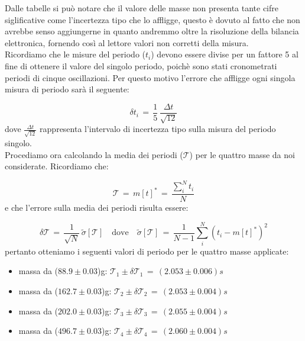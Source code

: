 Dalle tabelle si può notare che il valore delle masse non presenta tante cifre siglificative come l'incertezza tipo che lo affligge, questo è dovuto al fatto che non avrebbe senso aggiungerne in quanto andremmo oltre la risoluzione della bilancia elettronica, fornendo così al lettore valori non corretti della misura.\\

Ricordiamo che le misure del periodo ($t_i$) devono essere divise per un fattore 5 al fine di ottenere il valore del singolo periodo, poichè sono stati  cronometrati periodi di cinque oscillazioni. Per questo motivo l'errore che affligge ogni singola misura di periodo sarà il seguente:

\begin{equation*}
	\delta t_i \,=\, \frac{1}{5} \, \frac{\Delta t}{\sqrt{12}}
\end{equation*}
%
dove $\frac{\Delta t}{\sqrt{12}}$ rappresenta l'intervalo di incertezza tipo sulla misura del periodo singolo.\\
Procediamo ora calcolando la media dei periodi ($\mathcal{T}$) per le quattro masse da noi considerate. Ricordiamo che:

\begin{equation*}
	\mathcal{T} \,=\, m[t]^* \,=\, \frac{\sum_{i}^{N} t_i}{N}
\end{equation*}
%
e che l'errore sulla media dei periodi risulta essere:

\begin{equation*}
	\delta \mathcal{T} \,=\, \frac{1}{\sqrt{N}} \, \tilde\sigma[\mathcal{T}] \quad \text{dove} \quad \tilde\sigma[\mathcal{T}] \,=\, \frac{1}{N-1} \sum_{i}^{N} (t_i - m[t]^*)^2
\end{equation*}
%
pertanto otteniamo i seguenti valori di periodo per le quattro masse applicate:
\begin{itemize}
	\item{ massa da ($88.9 \pm 0.03$)g: $\mathcal{T}_1 \pm \delta\mathcal{T}_1 \,=\, (2.053 \pm 0.006) s $}
	\item{ massa da ($162.7 \pm 0.03$)g: $\mathcal{T}_2 \pm \delta\mathcal{T}_2 \,=\, (2.053 \pm 0.004) s $}
	\item{ massa da ($202.0 \pm 0.03$)g: $\mathcal{T}_3 \pm \delta\mathcal{T}_3 \,=\, (2.055 \pm 0.004) s $}
	\item{ massa da ($496.7 \pm 0.03$)g: $\mathcal{T}_4 \pm \delta\mathcal{T}_4 \,=\, (2.060 \pm 0.004) s $}
\end{itemize}


